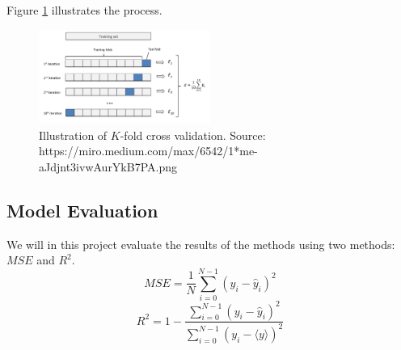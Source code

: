 \documentclass[reprint,english,notitlepage]{revtex4-1}  %
\begin{document}
Figure \ref{kfold} illustrates the process.

\begin{figure}[h]
    \centering
    \includegraphics[width=0.50\textwidth]{kfold.png}
    \caption{Illustration of $K$-fold cross validation. Source: https://miro.medium.com/max/6542/1*me-aJdjnt3ivwAurYkB7PA.png}
    \label{kfold}
\end{figure}


\subsection{Model Evaluation}
We will in this project evaluate the results of the methods using two methods: $MSE$ and $R^2$.
\begin{equation} \label{MSE}
	MSE = \frac{1}{N}\sum_{i=0}^{N-1}(y_i - \hat{y}_i)^2
\end{equation}
\begin{equation} \label{R2}
	R^2 = 1 - \frac{\sum_{i=0}^{N-1}(y_i - \hat{y}_i)^2}{\sum_{i=0}^{N-1}(y_i - \langle y \rangle)^2}
\end{equation}
\end{document}
